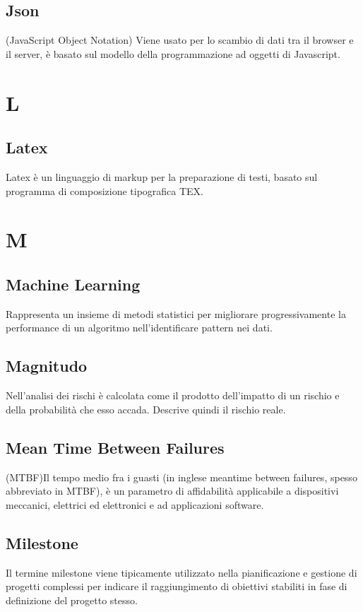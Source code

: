     \subsection*{Json}
(JavaScript Object Notation) Viene usato per lo scambio di dati tra il browser e il server, è basato sul modello della programmazione ad oggetti di Javascript.
\newpage

\section{L}
    \subsection*{Latex}
Latex è un linguaggio di markup per la preparazione di testi, basato sul programma di composizione tipografica TEX.
\newpage

\section{M}
    \subsection*{Machine Learning}
Rappresenta un insieme di metodi statistici per migliorare progressivamente la performance di un algoritmo nell’identificare pattern nei dati.
    \subsection*{Magnitudo}
Nell’analisi dei rischi è calcolata come il prodotto dell’impatto di un rischio e della probabilità che esso accada. Descrive quindi il rischio reale.
    \subsection*{Mean Time Between Failures}
(MTBF)Il tempo medio fra i guasti (in inglese meantime between failures, spesso abbreviato in MTBF), è un parametro di affidabilità applicabile a dispositivi meccanici, elettrici ed elettronici e ad applicazioni software.
    \subsection*{Milestone}
Il termine milestone viene tipicamente utilizzato nella pianificazione e gestione di progetti complessi per indicare il raggiungimento di obiettivi stabiliti in fase di definizione del progetto stesso.
\newpage


